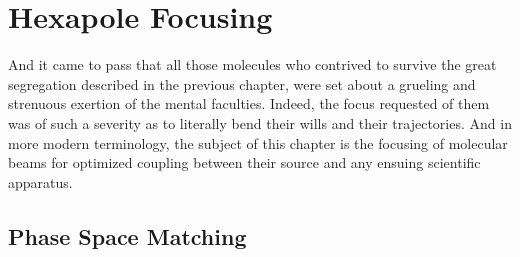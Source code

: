 \ifx\justbeingincluded\undefined

\fi

\chapter{Hexapole Focusing}
\label{chapter:hex}

And it came to pass that all those molecules who contrived to survive the great segregation described in the previous chapter, were set about a grueling and strenuous exertion of the mental faculties. Indeed, the focus requested of them was of such a severity as to literally bend their wills and their trajectories. And in more modern terminology, the subject of this chapter is the focusing of molecular beams for optimized coupling between their source and any ensuing scientific apparatus.

\section{Phase Space Matching}

